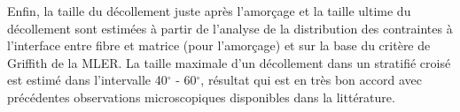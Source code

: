 Enfin, la taille du d\'ecollement juste apr\`es l'amor\c{c}age et la taille ultime du d\'ecollement sont estim\'ees \`a partir de l'analyse de la distribution des contraintes \`a l'interface entre fibre et matrice (pour l'amor\c{c}age) et sur la base du crit\`ere de Griffith de la MLER. La taille maximale d'un d\'ecollement dans un stratifi\'e crois\'e est estim\'e dans l'intervalle 40$^{\circ}$ - 60$^{\circ}$, r\'esultat qui est en tr\`es bon accord avec pr\'ec\'edentes observations microscopiques disponibles dans la litt\'erature.

